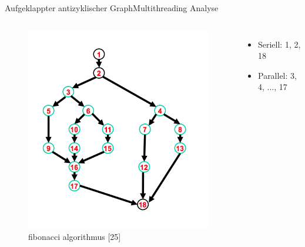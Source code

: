 \documentclass{beamer}
\begin{document}
\begin{frame}{Aufgeklappter antizyklischer Graph}{Multithreading Analyse}
\begin{columns}
        \begin{figure}
        \centering
        \includegraphics[width=1\columnwidth]{./assets/gag.png}
        \caption{fibonacci algorithmus \cite{Herlihy1}[25]}
        \label{fig:my_label}
        \end{figure}
    
        \begin{itemize}
        \item Seriell: 1, 2, 18
        \item Parallel: 3, 4, ..., 17
        \end{itemize}
    
\end{columns}


\end{frame}
\end{document}
